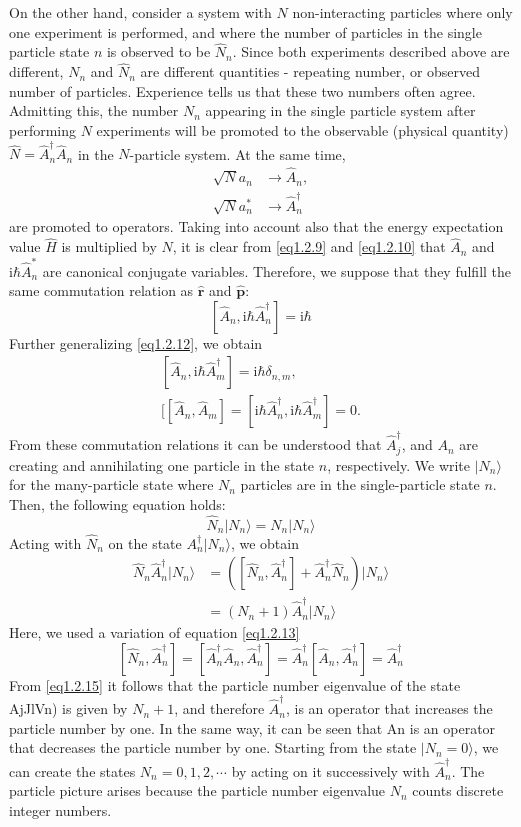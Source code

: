 \documentclass[twoside,11pt]{report}
\def\be{\begin{equation}}
\def\ee{\end{equation}}
\def\ii{\text{i}}
\begin{document}
On the other hand, consider a system with $N$ non-interacting particles where only one experiment is performed, and where the number of particles in the single particle state $n$ is observed to be $\hat{N}_n$. Since both experiments described above are different, $N_n$ and $\hat{N}_n$ are different quantities - repeating number, or observed number of particles. Experience tells us that these two numbers often agree. Admitting this, the number $N_n$ appearing in the single particle system after performing $N$ experiments will be promoted to the observable (physical quantity) $\hat N=\hat{A}_n^\dagger\hat{A}_n$ in the $N$-particle system. At the same time, 
\be\begin{split}
\sqrt{N}a_n&\to\hat{A}_n,\\
\sqrt{N}a_n^*&\to\hat{A}_n^\dagger
\end{split}\ee
are promoted to operators. Taking into account also that the energy expectation value $\hat{H}$ is multiplied by $N$, it is clear from \eqref{eq1.2.9} and \eqref{eq1.2.10} that $\hat{A}_n$ and $\ii\hbar\hat{A}_n^*$ are canonical conjugate variables. Therefore, we suppose that they fulfill the same commutation relation as $\hat{\bm r}$ and $\hat{\bm p}$:
\be\label{eq1.2.12}
[\hat{A}_n,\ii\hbar\hat{A}_n^\dagger]=\ii\hbar
\ee
Further generalizing \eqref{eq1.2.12}, we obtain
\be\label{eq1.2.13}\begin{split}
[\hat{A}_n,\ii\hbar\hat{A}_m^\dagger]=\ii\hbar\delta_{n,m},\\
[[\hat{A}_n,\hat{A}_m]=[\ii\hbar\hat{A}_n^\dagger,\ii\hbar\hat{A}_m^\dagger]=0.
\end{split}\ee
From these commutation relations it can be understood that $\hat{A}_j^\dagger$, and $A_n$ are creating and annihilating one particle in the state $n$, respectively. We write $|N_n\rangle$ for the many-particle state where $N_n$ particles are in the single-particle state $n$. Then, the following equation holds:
\be
\hat{N}_n|N_n\rangle=N_n|N_n\rangle
\ee
Acting with $\hat{N}_n$ on the state $A_n^\dagger|N_n\rangle$, we obtain
\be\label{eq1.2.15}\begin{split}
\hat{N}_n\hat{A}_n^\dagger|N_n\rangle&=([\hat{N}_n,\hat{A}_n^\dagger]+\hat{A}_n^\dagger\hat{N}_n)|N_n\rangle\\
&=(N_n+1)\hat{A}_n^\dagger|N_n\rangle
\end{split}\ee
Here, we used a variation of equation \eqref{eq1.2.13}
\be\tag{1.2.13'}
[\hat{N}_n,\hat{A}_n^\dagger]=[\hat{A}_n^\dagger\hat{A}_n,\hat{A}_n^\dagger]=\hat{A}_n^\dagger[\hat{A}_n,\hat{A}_n^\dagger]=\hat{A}_n^\dagger
\ee
From \eqref{eq1.2.15} it follows that the particle number eigenvalue of the state AjJlVn) is given by $N_n + 1$, and therefore $\hat{A}_n^\dagger$, is an operator that increases the particle number by one. In the same way, it can be seen that An is an operator that decreases the particle number by one. Starting from the state $|N_n = 0\rangle$, we can create the states $N_n = 0,1,2,\cdots$ by acting on it successively with $\hat{A}^\dagger_n$. The particle picture arises because the particle number eigenvalue $N_n$ counts discrete integer numbers.
\end{document}
